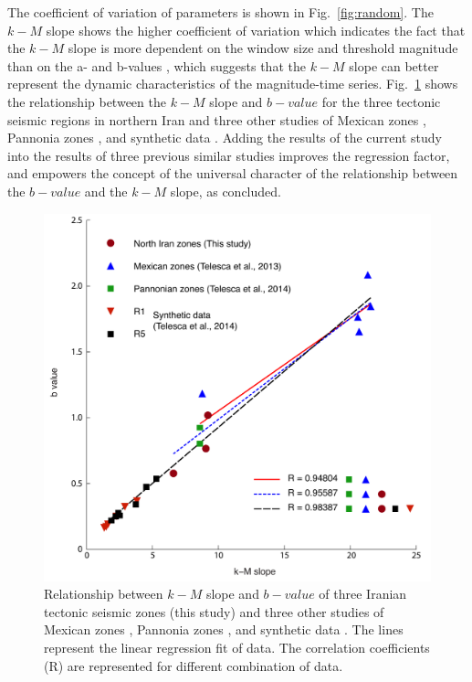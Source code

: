 \noindent
The coefficient of variation of parameters is shown in Fig.~\ref{fig:random}. The  $k-M$  slope shows the higher coefficient of variation which indicates the fact that the  $k-M$  slope is more dependent on the window size and threshold magnitude than on the a-  and  b-values , which suggests that  the $k-M$  slope can better represent the dynamic characteristics of the magnitude-time series. 
 \noindent
 Fig.~\ref{fig:regression} shows the relationship between the  $k-M$  slope and $b-value$ for the three tectonic seismic regions in northern Iran and three other studies of Mexican zones  \citep{Telesca2013}, Pannonia zones  \citep{Telesca2014}, and synthetic data \citep{Telesca2014-pone}. Adding the results of the current study into the results of three previous similar studies improves the regression factor, and empowers the concept of the universal character of the relationship between the  $b-value$  and the  $k-M$  slope, as  \citet{Telesca2014} concluded. 
 
\begin{figure} [ht]
\centering
\includegraphics[scale=0.6]{figures/pdf/Figure09.pdf} 
\caption{ Relationship between $k-M$ slope and $b-value$ of three Iranian tectonic seismic zones (this study) and three other studies of Mexican zones \citep{Telesca2013}, Pannonia zones \citep{Telesca2014}, and synthetic data \citep{Telesca2014-pone}. The lines represent the linear regression fit of data. The correlation coefficients (R) are represented for different combination of data.}
\label{fig:regression}
\end{figure}

